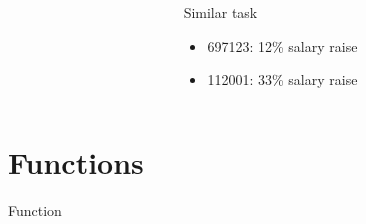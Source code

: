 \documentclass[aspectratio=169]{beamer}
\newcommand{\style}[1]{\ttfamily#1}
\begin{document}
\begin{frame}[fragile]
  
\end{frame}

\begin{frame}[fragile]
  \begin{columns}
    \begin{column}{0.5\textwidth}
      
    \end{column}
    \begin{column}{0.5\textwidth}
    \end{column}
  \end{columns}
\end{frame}

\begin{frame}[fragile]
  \begin{columns}
    \begin{column}{0.5\textwidth}
      
    \end{column}
    \begin{column}{0.5\textwidth}
      Similar task
      \begin{itemize}
        \item 697123: 12\% salary raise
        \item 112001: 33\% salary raise
      \end{itemize}
    \end{column}
  \end{columns}
\end{frame}

\begin{frame}[fragile]
  
\end{frame}

\begin{frame}[fragile,label=longcode]
  
\end{frame}

\section{Functions}

\begin{frame}
  \centering
  \Huge
  Function
\end{frame}
\end{document}
